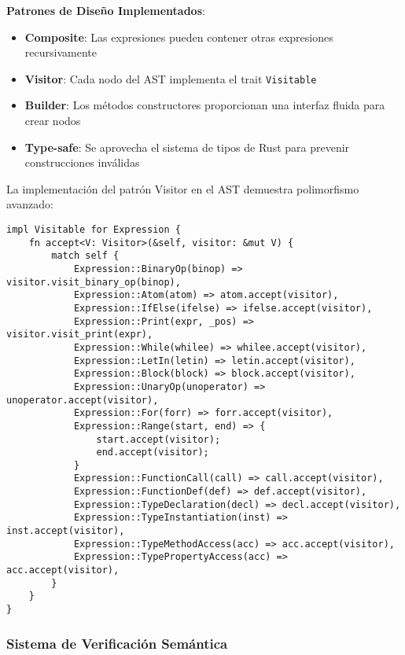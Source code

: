 \documentclass[12pt,a4paper]{article}
\begin{document}
\textbf{Patrones de Diseño Implementados}:
\begin{itemize}
    \item \textbf{Composite}: Las expresiones pueden contener otras expresiones recursivamente
    \item \textbf{Visitor}: Cada nodo del AST implementa el trait \texttt{Visitable}
    \item \textbf{Builder}: Los métodos constructores proporcionan una interfaz fluida para crear nodos
    \item \textbf{Type-safe}: Se aprovecha el sistema de tipos de Rust para prevenir construcciones inválidas
\end{itemize}

La implementación del patrón Visitor en el AST demuestra polimorfismo avanzado:

\begin{lstlisting}[style=rustcode,caption=Implementación del patrón Visitor]
impl Visitable for Expression {
    fn accept<V: Visitor>(&self, visitor: &mut V) {
        match self {
            Expression::BinaryOp(binop) => visitor.visit_binary_op(binop),
            Expression::Atom(atom) => atom.accept(visitor),
            Expression::IfElse(ifelse) => ifelse.accept(visitor),
            Expression::Print(expr, _pos) => visitor.visit_print(expr),
            Expression::While(whilee) => whilee.accept(visitor),
            Expression::LetIn(letin) => letin.accept(visitor),
            Expression::Block(block) => block.accept(visitor),
            Expression::UnaryOp(unoperator) => unoperator.accept(visitor),
            Expression::For(forr) => forr.accept(visitor),
            Expression::Range(start, end) => {
                start.accept(visitor);
                end.accept(visitor);
            }
            Expression::FunctionCall(call) => call.accept(visitor),
            Expression::FunctionDef(def) => def.accept(visitor),
            Expression::TypeDeclaration(decl) => decl.accept(visitor),
            Expression::TypeInstantiation(inst) => inst.accept(visitor),
            Expression::TypeMethodAccess(acc) => acc.accept(visitor),
            Expression::TypePropertyAccess(acc) => acc.accept(visitor),
        }
    }
}
\end{lstlisting}

\subsubsection{Sistema de Verificación Semántica}
\end{document}
